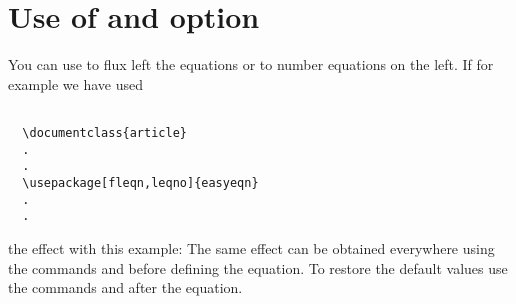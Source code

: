 \documentclass[a4paper]{article}
\begin{document}
\section{Use of  and  option}
You can use  to flux left the equations or
 to number equations on the left.
If for example we have used
\begin{verbatim}

  \documentclass{article}
  .
  .
  \usepackage[fleqn,leqno]{easyeqn}
  .
  .

\end{verbatim}
the effect with this example:%
%
\equationleft\numberleft 
{}
\equationcenter\numberright
%
The same effect can be obtained everywhere using the commands
 and  before defining
the equation. To restore the default values use the commands
 and  after the equation.
%
\end{document}
